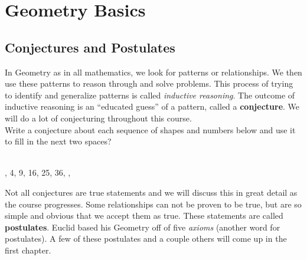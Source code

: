 
\chapter{Geometry Basics}
\label{part:terminology}

			\section{Conjectures and Postulates}

In Geometry as in all mathematics, we look for patterns or relationships.  We then use these patterns to reason through and solve problems.  This process of trying to identify and generalize patterns is called \emph{inductive reasoning}.  The outcome of inductive reasoning is an ``educated guess'' of a pattern, called a \textbf{conjecture}.  We will do a lot of conjecturing throughout this course.\\
\q Write a conjecture about each sequence of shapes and numbers below and use it to fill in the next two spaces?\\\\

\noindent
{}
\vspace{0.5cm}

, 4, 9, 16, 25, 36, \underline{\hspace{2cm}}, \underline{\hspace{2cm}}
\vspace{0.5cm}

Not all conjectures are true statements and we will discuss this in great detail as the course progresses.  Some relationships can not be proven to be true, but are so simple and obvious that we accept them as true.  These statements are called \textbf{postulates}.  Euclid based his Geometry off of five \emph{axioms} (another word for postulates).  A few of these postulates and a couple others will come up in the first chapter.\\

